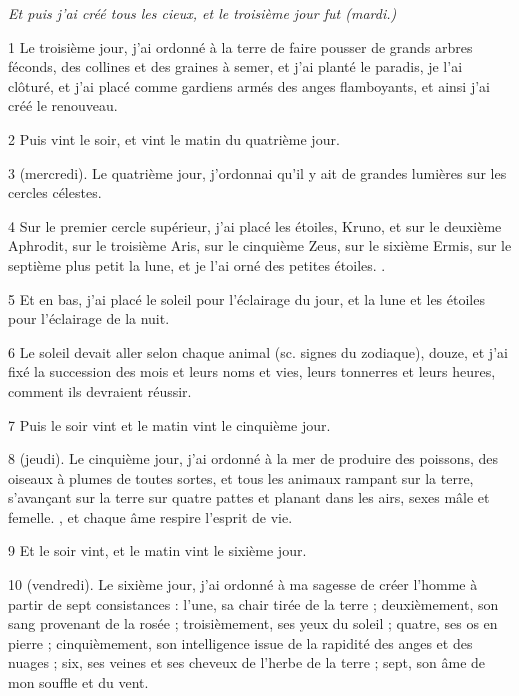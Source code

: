 
\par \textit{Et puis j'ai créé tous les cieux, et le troisième jour fut (mardi.)}

\par 1 Le troisième jour, j'ai ordonné à la terre de faire pousser de grands arbres féconds, des collines et des graines à semer, et j'ai planté le paradis, je l'ai clôturé, et j'ai placé comme gardiens armés des anges flamboyants, et ainsi j'ai créé le renouveau.

\par 2 Puis vint le soir, et vint le matin du quatrième jour.

\par 3 (mercredi). Le quatrième jour, j'ordonnai qu'il y ait de grandes lumières sur les cercles célestes.

\par 4 Sur le premier cercle supérieur, j'ai placé les étoiles, Kruno, et sur le deuxième Aphrodit, sur le troisième Aris, sur le cinquième Zeus, sur le sixième Ermis, sur le septième plus petit la lune, et je l'ai orné des petites étoiles. .

\par 5 Et en bas, j'ai placé le soleil pour l'éclairage du jour, et la lune et les étoiles pour l'éclairage de la nuit.

\par 6 Le soleil devait aller selon chaque animal (sc. signes du zodiaque), douze, et j'ai fixé la succession des mois et leurs noms et vies, leurs tonnerres et leurs heures, comment ils devraient réussir.

\par 7 Puis le soir vint et le matin vint le cinquième jour.

\par 8 (jeudi). Le cinquième jour, j'ai ordonné à la mer de produire des poissons, des oiseaux à plumes de toutes sortes, et tous les animaux rampant sur la terre, s'avançant sur la terre sur quatre pattes et planant dans les airs, sexes mâle et femelle. , et chaque âme respire l'esprit de vie.

\par 9 Et le soir vint, et le matin vint le sixième jour.

\par 10 (vendredi). Le sixième jour, j'ai ordonné à ma sagesse de créer l'homme à partir de sept consistances : l'une, sa chair tirée de la terre ; deuxièmement, son sang provenant de la rosée ; troisièmement, ses yeux du soleil ; quatre, ses os en pierre ; cinquièmement, son intelligence issue de la rapidité des anges et des nuages ; six, ses veines et ses cheveux de l'herbe de la terre ; sept, son âme de mon souffle et du vent.

